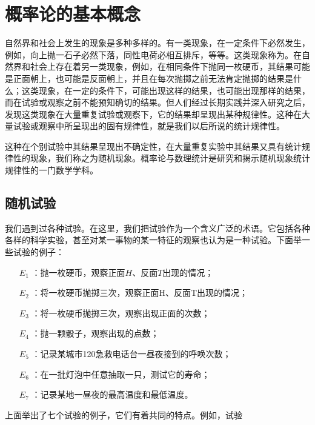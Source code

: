 \chapter{概率论的基本概念}

自然界和社会上发生的现象是多种多样的。有一类现象，在一定条件下必然发生，例如，向上抛一石子必然下落，同性电荷必相互排斥，等等。这类现象称为。在自然界和社会上存在着另一类现象，例如，在相同条件下抛同一枚硬币，其结果可能是正面朝上，也可能是反面朝上，并且在每次抛掷之前无法肯定抛掷的结果是什么；这类现象，在一定的条件下，可能出现这样的结果，也可能出现那样的结果，而在试验或观察之前不能预知确切的结果。但人们经过长期实践并深入研究之后，发现这类现象在大量重复试验或观察下，它的结果却呈现出某种规律性。这种在大量试验或观察中所呈现出的固有规律性，就是我们以后所说的统计规律性。

这种在个别试验中其结果呈现出不确定性，在大量重复实验中其结果又具有统计规律性的现象，我们称之为随机现象。概率论与数理统计是研究和揭示随机现象统计规律性的一门数学学科。

\section{随机试验}

我们遇到过各种试验。在这里，我们把试验作为一个含义广泛的术语。它包括各种各样的科学实验，甚至对某一事物的某一特征的观察也认为是一种试验。下面举一些试验的例子：
\begin{itemize}
	\item[$ E_1 $] ：抛一枚硬币，观察正面$ H $、反面$ T $出现的情况；
	\item[$ E_2 $] ：将一枚硬币抛掷三次，观察正面H、反面T出现的情况；
	\item[$ E_3 $] ：将一枚硬币抛掷三次，观察出现正面的次数；
	\item[$ E_4 $] ：抛一颗骰子，观察出现的点数；
	\item[$ E_5 $] ：记录某城市120急救电话台一昼夜接到的呼唤次数；
	\item[$ E_6 $] ：在一批灯泡中任意抽取一只，测试它的寿命；
	\item[$ E_7 $] ：记录某地一昼夜的最高温度和最低温度。
\end{itemize}

上面举出了七个试验的例子，它们有着共同的特点。例如，试验
